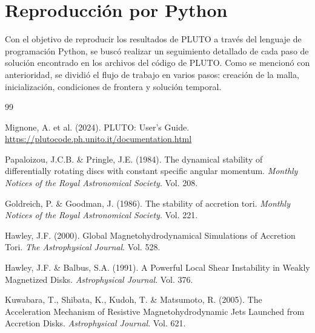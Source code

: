 \documentclass[11pt, letterpaper]{article}
\begin{document}
\section{Reproducción por Python}

Con el objetivo de reproducir los resultados de PLUTO a través del lenguaje de programación Python, se buscó realizar un seguimiento detallado de cada paso de solución encontrado en los archivos del código de PLUTO. Como se mencionó con anterioridad, se dividió el flujo de trabajo en varios pasos: creación de la malla, inicialización, condiciones de frontera y solución temporal.



\begin{thebibliography}{99}

Mignone, A. et al. (2024). PLUTO: User's Guide. \url{https://plutocode.ph.unito.it/documentation.html}

Papaloizou, J.C.B. \& Pringle, J.E. (1984). The dynamical stability of differentially rotating discs with constant specific angular momentum. \textit{Monthly Notices of the Royal Astronomical Society}. Vol. 208. 

Goldreich, P. \& Goodman, J. (1986). The stability of accretion tori. \textit{Monthly Notices of the Royal Astronomical Society}. Vol. 221. 

Hawley, J.F. (2000). Global Magnetohydrodynamical Simulations of Accretion Tori. \textit{The Astrophysical Journal}. Vol. 528. 

Hawley, J.F. \& Balbus, S.A. (1991). A Powerful Local Shear Instability in Weakly Magnetized Disks. \textit{Astrophysical Journal}. Vol. 376. 

Kuwabara, T., Shibata, K., Kudoh, T. \& Matsumoto, R. (2005). The Acceleration Mechanism of Resistive Magnetohydrodynamic Jets Launched from Accretion Disks. \textit{Astrophysical Journal}. Vol. 621. 

\end{thebibliography}
\end{document}
